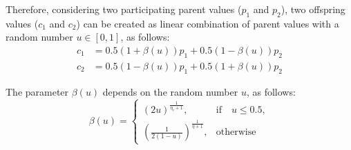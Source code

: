 Therefore, considering two participating parent values ($p_1$ and $p_2$), two offspring values ($c_1$ and $c_2$) can be created as linear combination of parent values with a random number $u \in [0, 1]$, as follows:
\begin{equation} 
\begin{split}
c_1 &= 0.5(1 + \beta(u))p_1 + 0.5(1 - \beta(u)) p_2 \\
c_2 &= 0.5(1 - \beta(u))p_1 + 0.5(1 + \beta(u)) p_2
\end{split}
\end{equation}

The parameter $\beta(u)$ depends on the random number $u$, as follows:
\begin{equation}
    \beta(u)= 
\begin{cases}
     (2u)^{\frac{1}{\eta_c+1}},& \text{if} \quad u \leq 0.5,\\
     	(\frac{1}{2(1-u)})^{\frac{1}{\eta+1}} ,& \text{otherwise}
\end{cases}
\end{equation}

